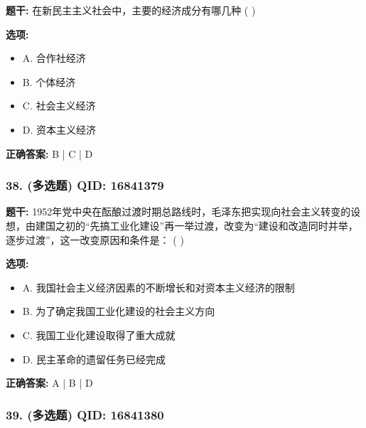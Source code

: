 \documentclass[12pt,UTF8]{ctexart}
\begin{document}
\textbf{题干:}
在新民主主义社会中，主要的经济成分有哪几种 ( )

\textbf{选项:}
\begin{itemize}[leftmargin=*]

  \item A. 合作社经济

  \item B. 个体经济

  \item C. 社会主义经济

  \item D. 资本主义经济

\end{itemize}

\textbf{正确答案:}
B | C | D

\vspace{0.3em}\hrulefill\vspace{0.7em}

\subsubsection*{38. (多选题) \small QID: 16841379}

\textbf{题干:}
1952年党中央在酝酿过渡时期总路线时，毛泽东把实现向社会主义转变的设想，由建国之初的“先搞工业化建设”再一举过渡，改变为“建设和改造同时并举，逐步过渡”，这一改变原因和条件是： ( )

\textbf{选项:}
\begin{itemize}[leftmargin=*]

  \item A. 我国社会主义经济因素的不断增长和对资本主义经济的限制

  \item B. 为了确定我国工业化建设的社会主义方向

  \item C. 我国工业化建设取得了重大成就

  \item D. 民主革命的遗留任务已经完成

\end{itemize}

\textbf{正确答案:}
A | B | D

\vspace{0.3em}\hrulefill\vspace{0.7em}

\subsubsection*{39. (多选题) \small QID: 16841380}
\end{document}
